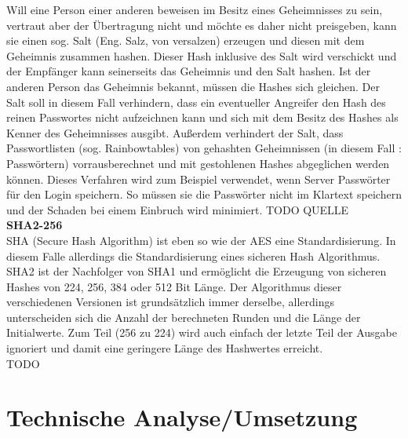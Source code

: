 \documentclass[12pt,a4paper,bibliography=totocnumbered,listof=totocnumbered]{scrartcl}
\begin{document}
Will eine Person einer anderen beweisen im Besitz eines Geheimnisses zu sein, vertraut aber der Übertragung nicht und möchte es daher nicht preisgeben, kann sie einen sog. Salt (Eng. Salz, von versalzen) erzeugen und diesen mit dem Geheimnis zusammen hashen. Dieser Hash inklusive des Salt wird verschickt und der Empfänger kann seinerseits das Geheimnis und den Salt hashen. Ist der anderen Person das Geheimnis bekannt, müssen die Hashes sich gleichen. Der Salt soll in diesem Fall verhindern, dass ein eventueller Angreifer den Hash des reinen Passwortes nicht aufzeichnen kann und sich mit dem Besitz des Hashes als Kenner des Geheimnisses ausgibt. Außerdem verhindert der Salt, dass Passwortlisten (sog. Rainbowtables) von gehashten Geheimnissen (in diesem Fall : Passwörtern) vorrausberechnet und mit gestohlenen Hashes abgeglichen werden können. Dieses Verfahren wird zum Beispiel verwendet, wenn Server Passwörter für den Login speichern. So müssen sie die Passwörter nicht im Klartext speichern und der Schaden bei einem Einbruch wird minimiert. 
TODO QUELLE
\\\textbf{SHA2-256}\\
SHA (Secure Hash Algorithm) ist eben so wie der AES eine Standardisierung. In diesem Falle allerdings die Standardisierung eines sicheren Hash Algorithmus. SHA2 ist der Nachfolger von SHA1 und ermöglicht die Erzeugung von sicheren Hashes von 224, 256, 384 oder 512 Bit Länge. Der Algorithmus dieser verschiedenen Versionen ist grundsätzlich immer derselbe, allerdings unterscheiden sich die Anzahl der berechneten Runden und die Länge der Initialwerte. Zum Teil (256 zu 224) wird auch einfach der letzte Teil der Ausgabe ignoriert und damit eine geringere Länge des Hashwertes erreicht.\\
\cite{10}\cite{13} TODO

\section{Technische Analyse/Umsetzung}\label{UmsetzungV}
\end{document}

